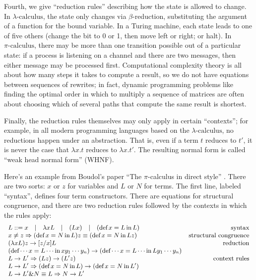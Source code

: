 \documentclass[submission,copyright,creativecommons]{eptcs}
\newcommand{\pic}{$\pi\mbox{-calculus}$\xspace}
\newcommand{\lac}{$\lambda\mbox{-calculus}$\xspace}
\begin{document}
Fourth, we give ``reduction rules'' describing how the state is allowed to change.  In \lac, the state only changes via $\beta$-reduction, substituting the argument of a function for the bound variable.  In a Turing machine, each state leads to one of five others (change the bit to 0 or 1, then move left or right; or halt).  In \pic, there may be more than one transition possible out of a particular state: if a process is listening on a channel and there are two messages, then either message may be processed first. Computational complexity theory is all about how many steps it takes to compute a result, so we do not have equations between sequences of rewrites; in fact, dynamic programming problems like finding the optimal order in which to multiply a sequence of matrices are often about choosing which of several paths that compute the same result is shortest.

Finally, the reduction rules themselves may only apply in certain ``contexts''; for example, in all modern programming languages based on the \lac, no reductions happen under an abstraction. That is, even if a term $t$ reduces to $t'$, it is never the case that $\lambda x.t$ reduces to $\lambda x.t'$.  The resulting normal form is
called ``weak head normal form'' (WHNF).

Here's an example from Boudol's paper ``The $\pi$-calculus in direct style'' \cite{Boudol}.
There are two sorts: $x$ or $z$ for variables and $L$ or $N$ for
terms.  The first line, labeled ``syntax'', defines four term constructors.  There are equations for structural congruence, and there are two reduction rules followed by the contexts in which the rules apply: 
\newcommand{\deff}{\mathop{\mbox{def}}}
\newcommand{\inn}{\mathop{\mbox{in}}}
\[\small
\begin{array}{lr}
  L ::= x \quad|\quad \lambda xL \quad|\quad (Lx) \quad|\quad (\deff x = L \inn L) & \mbox{syntax}\\
  x \ne z \Rightarrow (\deff x = N \inn L)z \equiv (\deff x = N \inn Lz) & \mbox{structural congruence}\\
  (\lambda xL)z \to [z/x]L & \mbox{reduction} \\
  (\deff \cdots x = L \cdots \inn xy_1\cdots y_n) \to (\deff \cdots x = L \cdots \inn Ly_1\cdots y_n) \\
  L \to L' \Rightarrow (Lz) \to (L'z) & \mbox{context rules} \\
  L \to L' \Rightarrow (\deff x=N \inn L)
\to (\deff x=N \inn L')\\
  L \to L' \& N \equiv L \Rightarrow N \to L'
\end{array}
\]
\end{document}
